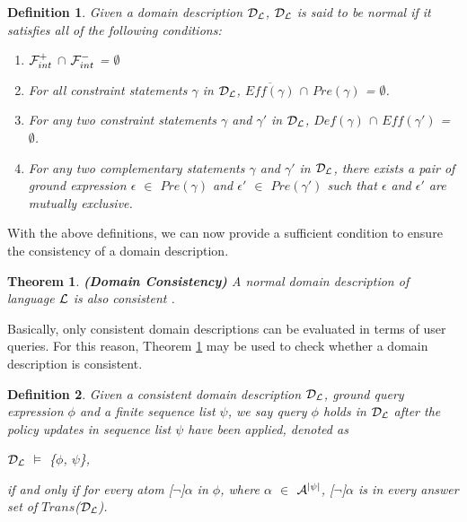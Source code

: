 \documentclass[11pt, twocolumn]{article}
\newtheorem{vtheorm}{Theorem}
\newtheorem{vdefinition}{Definition}
\newenvironment{vtheorem}[1]
  {\begin{vtheorm}{\bf (#1)\hspace{0.5em}}}
  {\end{vtheorm}}
\newenvironment{vquote}
  {\begin{list}{}{\leftmargin 1em}\item[]}
  {\end{list}}
\begin{document}
    \begin{vdefinition}
      \label{def-norm}
      Given a domain description ${\cal D_{L}}$, ${\cal D_{L}}$ is said to
      be {\em normal} if it satisfies all of the following conditions:
      \begin{enumerate}
        \item
          ${\cal F}^{+}_{int}$ $\cap$ ${\cal F}^{-}_{int}$ = $\emptyset$
        \item
          For all constraint statements $\gamma$ in ${\cal D_{L}}$,
          $\overline{Eff(\gamma)}$ $\cap$ $Pre(\gamma)$ = $\emptyset$.
        \item
          For any two constraint statements $\gamma$ and $\gamma'$ in
          ${\cal D_{L}}$, $Def(\gamma)$ $\cap$ $Eff(\gamma')$ =
          $\emptyset$.
        \item
          For any two {\em complementary} statements $\gamma$ and $\gamma'$ in
          ${\cal D_{L}}$, there exists a pair of ground expression $\epsilon$
          $\in$ $Pre(\gamma)$ and $\epsilon'$ $\in$ $Pre(\gamma')$ such that
          $\epsilon$ and $\epsilon'$ are {\em mutually exclusive}.
      \end{enumerate}
    \end{vdefinition}

    With the above definitions, we can now provide a sufficient condition to
    ensure the consistency of a domain description.

    \begin{vtheorem}{Domain Consistency}
      \label{the-cons}
      A {\em normal} domain description of language ${\cal L}$ is also
      {\em consistent} \footnotemark.
    \end{vtheorem}


    Basically, only consistent domain descriptions can be evaluated in terms
    of user queries. For this reason, Theorem \ref{the-cons} may be used to
    check whether a domain description is consistent.

    \begin{vdefinition}
      \label{def-eval}
      Given a {\em consistent} domain description ${\cal D}_{\cal L}$, ground
      query expression $\phi$ and a finite sequence list $\psi$, we say
      {\em query $\phi$ holds in ${\cal D}_{\cal L}$ after the policy updates
      in sequence list $\psi$ have been applied}, denoted as

      \begin{vquote}
        ${\cal D}_{\cal L}$ $\models$ \{$\phi$, $\psi$\},
      \end{vquote}

      \noindent if and only if for every atom [$\lnot$]$\alpha$ in $\phi$,
      where $\alpha$ $\in$ ${\cal A}^{|\psi|}$, [$\lnot$]$\alpha$ is in
      every answer set of $Trans$(${\cal D}_{\cal L}$).
    \end{vdefinition}
\end{document}
